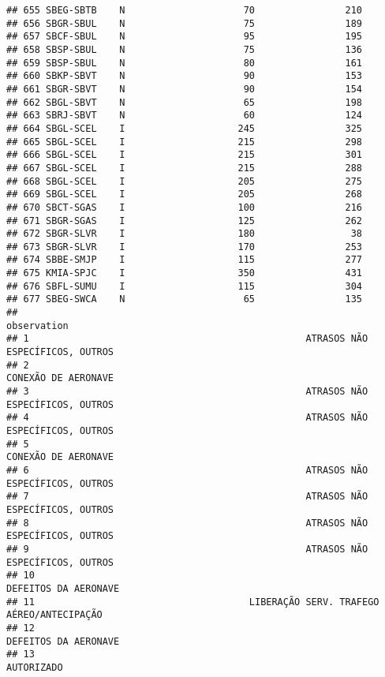 \documentclass[
]{article}
\begin{document}
\begin{verbatim}
## 655 SBEG-SBTB    N                     70                210
## 656 SBGR-SBUL    N                     75                189
## 657 SBCF-SBUL    N                     95                195
## 658 SBSP-SBUL    N                     75                136
## 659 SBSP-SBUL    N                     80                161
## 660 SBKP-SBVT    N                     90                153
## 661 SBGR-SBVT    N                     90                154
## 662 SBGL-SBVT    N                     65                198
## 663 SBRJ-SBVT    N                     60                124
## 664 SBGL-SCEL    I                    245                325
## 665 SBGL-SCEL    I                    215                298
## 666 SBGL-SCEL    I                    215                301
## 667 SBGL-SCEL    I                    215                288
## 668 SBGL-SCEL    I                    205                275
## 669 SBGL-SCEL    I                    205                268
## 670 SBCT-SGAS    I                    100                216
## 671 SBGR-SGAS    I                    125                262
## 672 SBGR-SLVR    I                    180                 38
## 673 SBGR-SLVR    I                    170                253
## 674 SBBE-SMJP    I                    115                277
## 675 KMIA-SPJC    I                    350                431
## 676 SBFL-SUMU    I                    115                304
## 677 SBEG-SWCA    N                     65                135
##                                                                       observation
## 1                                                 ATRASOS NÃO ESPECÍFICOS, OUTROS
## 2                                                             CONEXÃO DE AERONAVE
## 3                                                 ATRASOS NÃO ESPECÍFICOS, OUTROS
## 4                                                 ATRASOS NÃO ESPECÍFICOS, OUTROS
## 5                                                             CONEXÃO DE AERONAVE
## 6                                                 ATRASOS NÃO ESPECÍFICOS, OUTROS
## 7                                                 ATRASOS NÃO ESPECÍFICOS, OUTROS
## 8                                                 ATRASOS NÃO ESPECÍFICOS, OUTROS
## 9                                                 ATRASOS NÃO ESPECÍFICOS, OUTROS
## 10                                                           DEFEITOS DA AERONAVE
## 11                                      LIBERAÇÃO SERV. TRAFEGO AÉREO/ANTECIPAÇÃO
## 12                                                           DEFEITOS DA AERONAVE
## 13                                                                     AUTORIZADO

\end{verbatim}
\end{document}
